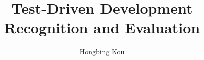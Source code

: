 \documentclass[11pt,proposal,times,thesis,actual]{uhthesis2e}
\begin{document}
\title{Test-Driven Development Recognition and Evaluation}
\author{Hongbing Kou}

\maketitle

\begin{frontmatter}

\end{frontmatter}









\end{document}
